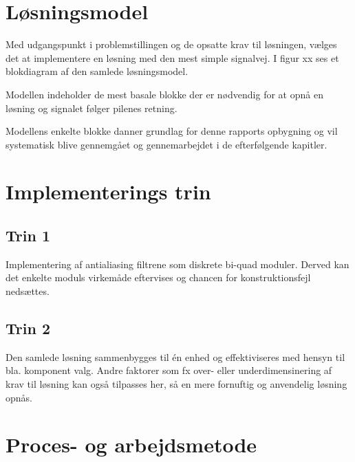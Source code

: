 \section{Løsningsmodel}
Med udgangspunkt i problemstillingen og de opsatte krav til løsningen, vælges det at implementere en løsning med den mest simple signalvej.
I figur xx ses et blokdiagram af den samlede løsningsmodel.


Modellen indeholder de mest basale blokke der er nødvendig for at opnå en løsning og signalet følger pilenes retning.

Modellens enkelte blokke danner grundlag for denne rapports opbygning og vil systematisk blive gennemgået og gennemarbejdet i de efterfølgende kapitler.


\section{Implementerings trin}

\subsection{Trin 1}
Implementering af antialiasing filtrene som diskrete bi-quad moduler. 
Derved kan det enkelte moduls virkemåde eftervises og chancen for konstruktionsfejl nedsættes.

\subsection{Trin 2}
Den samlede løsning sammenbygges til én enhed og effektiviseres med hensyn til bla. komponent valg. 
Andre faktorer som fx over- eller underdimensinering af krav til løsning kan også tilpasses her, så en mere fornuftig og anvendelig løsning opnås.


\section{Proces- og arbejdsmetode}
